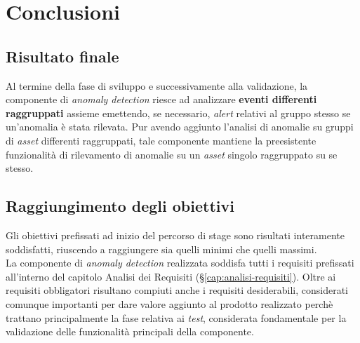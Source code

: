 
\chapter{Conclusioni}
\label{cap:conclusioni}


\section{Risultato finale}
Al termine della fase di sviluppo e successivamente alla validazione, la componente di \textit{anomaly detection} riesce ad analizzare \textbf{eventi differenti raggruppati} assieme emettendo, se necessario, \textit{alert} relativi al gruppo stesso se un'anomalia è stata rilevata. Pur avendo aggiunto l'analisi di anomalie su gruppi di \textit{asset} differenti raggruppati, tale componente mantiene la preesistente funzionalità di rilevamento di anomalie su un \textit{asset} singolo raggruppato su se stesso.

\section{Raggiungimento degli obiettivi}
Gli obiettivi prefissati ad inizio del percorso di stage sono risultati interamente soddisfatti, riuscendo a raggiungere sia quelli minimi che quelli massimi.\\
La componente di \textit{anomaly detection} realizzata soddisfa tutti i requisiti prefissati all'interno del capitolo Analisi dei Requisiti (\S\ref{cap:analisi-requisiti}). Oltre ai requisiti obbligatori risultano compiuti anche i requisiti desiderabili, considerati comunque importanti per dare valore aggiunto al prodotto realizzato perchè trattano principalmente la fase relativa ai \textit{test}, considerata fondamentale per la validazione delle funzionalità principali della componente.

